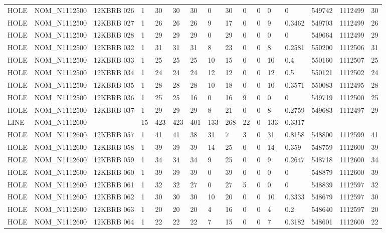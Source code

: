 \begin{table}[ht]
\begin{tabular}{llllllllllllllll}
HOLE & NOM\_N1112500 & 12KBRB 026 & 1 & 30 & 30 & 30 & 0 & 30 & 0 & 0 & 0 & 0 & 549742 & 1112499 & 30 \\
HOLE & NOM\_N1112500 & 12KBRB 027 & 1 & 26 & 26 & 26 & 9 & 17 & 0 & 0 & 9 & 0.3462 & 549703 & 1112499 & 26 \\
HOLE & NOM\_N1112500 & 12KBRB 028 & 1 & 29 & 29 & 29 & 0 & 29 & 0 & 0 & 0 & 0 & 549664 & 1112499 & 29 \\
HOLE & NOM\_N1112500 & 12KBRB 032 & 1 & 31 & 31 & 31 & 8 & 23 & 0 & 0 & 8 & 0.2581 & 550200 & 1112506 & 31 \\
HOLE & NOM\_N1112500 & 12KBRB 033 & 1 & 25 & 25 & 25 & 10 & 15 & 0 & 0 & 10 & 0.4 & 550160 & 1112507 & 25 \\
HOLE & NOM\_N1112500 & 12KBRB 034 & 1 & 24 & 24 & 24 & 12 & 12 & 0 & 0 & 12 & 0.5 & 550121 & 1112502 & 24 \\
HOLE & NOM\_N1112500 & 12KBRB 035 & 1 & 28 & 28 & 28 & 10 & 18 & 0 & 0 & 10 & 0.3571 & 550083 & 1112495 & 28 \\
HOLE & NOM\_N1112500 & 12KBRB 036 & 1 & 25 & 25 & 16 & 0 & 16 & 9 & 0 & 0 & 0 & 549719 & 1112500 & 25 \\
HOLE & NOM\_N1112500 & 12KBRB 037 & 1 & 29 & 29 & 29 & 8 & 21 & 0 & 0 & 8 & 0.2759 & 549683 & 1112497 & 29 \\
LINE & NOM\_N1112600 &  & 15 & 423 & 423 & 401 & 133 & 268 & 22 & 0 & 133 & 0.3317 &  &  &  \\
HOLE & NOM\_N1112600 & 12KBRB 057 & 1 & 41 & 41 & 38 & 31 & 7 & 3 & 0 & 31 & 0.8158 & 548800 & 1112599 & 41 \\
HOLE & NOM\_N1112600 & 12KBRB 058 & 1 & 39 & 39 & 39 & 14 & 25 & 0 & 0 & 14 & 0.359 & 548759 & 1112600 & 39 \\
HOLE & NOM\_N1112600 & 12KBRB 059 & 1 & 34 & 34 & 34 & 9 & 25 & 0 & 0 & 9 & 0.2647 & 548718 & 1112600 & 34 \\
HOLE & NOM\_N1112600 & 12KBRB 060 & 1 & 39 & 39 & 39 & 0 & 39 & 0 & 0 & 0 & 0 & 548879 & 1112600 & 39 \\
HOLE & NOM\_N1112600 & 12KBRB 061 & 1 & 32 & 32 & 27 & 0 & 27 & 5 & 0 & 0 & 0 & 548839 & 1112597 & 32 \\
HOLE & NOM\_N1112600 & 12KBRB 062 & 1 & 30 & 30 & 30 & 10 & 20 & 0 & 0 & 10 & 0.3333 & 548679 & 1112597 & 30 \\
HOLE & NOM\_N1112600 & 12KBRB 063 & 1 & 20 & 20 & 20 & 4 & 16 & 0 & 0 & 4 & 0.2 & 548640 & 1112597 & 20 \\
HOLE & NOM\_N1112600 & 12KBRB 064 & 1 & 22 & 22 & 22 & 7 & 15 & 0 & 0 & 7 & 0.3182 & 548601 & 1112600 & 22 \\

\end{tabular}
\end{table}
